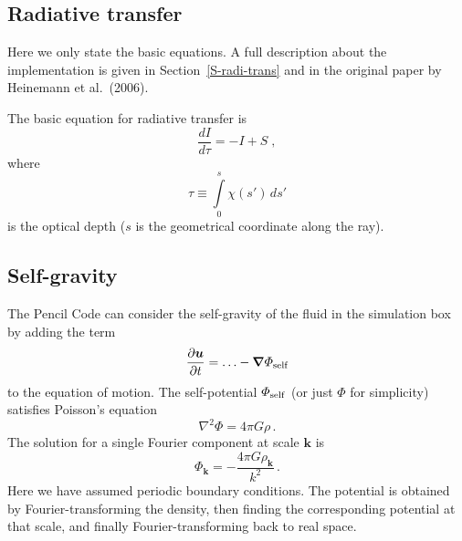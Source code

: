 \documentclass[\mydriver,12pt,twoside,notitlepage,a4paper]{article}
\renewcommand{\vec}[1]{{\boldsymbol #1}}
\newcommand{\nab}{\mbox{\boldmath $\nabla$} {}}
\begin{document}
\subsection{Radiative transfer}

Here we only state the basic equations.
A full description about the implementation is given in
Section~\ref{S-radi-trans} and in the original paper by
Heinemann et al.\ (2006).

The basic equation for radiative transfer is
\begin{equation} \label{radiative-transfer}
  \frac{dI}{d\tau} = -I +S \; ,
\end{equation}
where
\begin{equation}
  \tau \equiv \int\limits_0^s \chi(s') \, ds'
\end{equation}
is the optical depth ($s$ is the geometrical coordinate along the ray).


\subsection{Self-gravity}

The {\sc Pencil Code} can consider the self-gravity of the fluid in the simulation
box by adding the term
\begin{equation}
  \frac{\partial \vec{u}}{\partial t}
      = \ldots - \nab \varPhi_{\rm self}
\end{equation}
to the equation of motion. The self-potential $\varPhi_{\rm self}$ (or just
$\varPhi$ for simplicity) satisfies Poisson's equation
\begin{equation}
  \nabla^2 \varPhi = 4 \pi G \rho \, .
\end{equation}
The solution for a single Fourier component at scale $\vec{k}$ is
\begin{equation}
  \varPhi_\vec{k} = -\frac{4 \pi G \rho_\vec{k}}{k^2} \, .
\end{equation}
Here we have assumed periodic boundary conditions. The potential is obtained by
Fourier-transforming the density, then finding the corresponding potential at
that scale, and finally Fourier-transforming back to real space.
\end{document}
